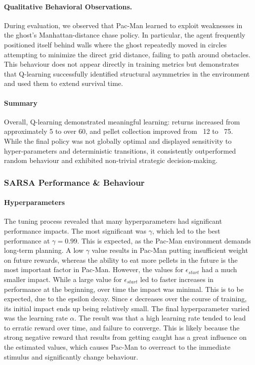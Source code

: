 \documentclass{article}
\begin{document}
\paragraph{Qualitative Behavioral Observations.}
During evaluation, we observed that Pac-Man learned to exploit weaknesses in the ghost's Manhattan-distance chase policy. In particular, the agent frequently positioned itself behind walls where the ghost repeatedly moved in circles attempting to minimize the direct grid distance, failing to path around obstacles. This behaviour does not appear directly in training metrics but demonstrates that Q-learning successfully identified structural asymmetries in the environment and used them to extend survival time.

\paragraph{Summary}
Overall, Q-learning demonstrated meaningful learning: returns increased from approximately 5 to over 60, and pellet collection improved from ~12 to ~75. While the final policy was not globally optimal and displayed sensitivity to hyper-parameters and deterministic transitions, it consistently outperformed random behaviour and exhibited non-trivial strategic decision-making.

\subsubsection{SARSA Performance \& Behaviour}

\paragraph{Hyperparameters}
The tuning process revealed that many hyperparameters had significant performance impacts. The most significant was $\gamma$, which led to the best performance at $\gamma=0.99$. This is expected, as the Pac-Man environment demands long-term planning. A low $\gamma$ value results in Pac-Man putting insufficient weight on future rewards, whereas the ability to eat more pellets in the future is the most important factor in Pac-Man. However, the values for $\epsilon_{start}$ had a much smaller impact. While a large value for $\epsilon_{start}$ led to faster increases in performance at the beginning, over time the impact was minimal. This is to be expected, due to the epsilon decay. Since $\epsilon$ decreases over the course of training, its initial impact ends up being relatively small. The final hyperparameter varied was the learning rate $\alpha$. The result was that a high learning rate tended to lead to erratic reward over time, and failure to converge. This is likely because the strong negative reward that results from getting caught has a great influence on the estimated values, which causes Pac-Man to overreact to the immediate stimulus and significantly change behaviour. 
\end{document}
